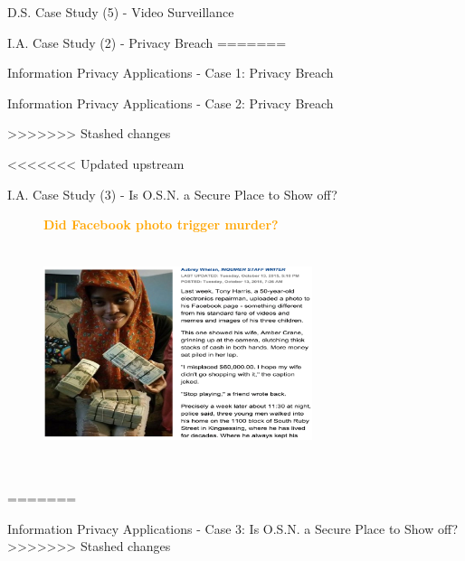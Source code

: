 \documentclass[
 size=14pt,
 paper=smartboard,  %
 mode=present, 		%
 display=slides, 	%
 style=tuliplab,  	%
 pauseslide,
 fleqn,leqno]{powerdot}
\begin{document}
\begin{slide}[toc=,bm=]{D.S. Case Study (5) - Video Surveillance}
\begin{slide}[toc=,bm=]{I.A. Case Study (2) - Privacy Breach}
=======
\begin{slide}[toc=,bm=]{Information Privacy Applications - Case 1: Privacy Breach}

\end{slide}


\begin{slide}[toc=,bm=]{Information Privacy Applications - Case 2: Privacy Breach}

>>>>>>> Stashed changes

\end{slide}


<<<<<<< Updated upstream
\begin{slide}[toc=,bm=]{I.A. Case Study (3) - Is O.S.N. a Secure Place to Show off?}

\begin{figure}[htbp]
	\centering
	\textbf{\large{\textcolor{orange}{Did Facebook photo trigger murder?\footnotemark[1]}}}
	\includegraphics[width=0.7\textwidth,height=7cm]{./figures/theme2/case3.eps}
\end{figure}
=======
\begin{slide}[toc=,bm=]{Information Privacy Applications - Case 3: Is O.S.N. a Secure Place to Show off?}
>>>>>>> Stashed changes



\end{slide}
\end{slide}
\end{slide}
\end{slide}
\end{document}
